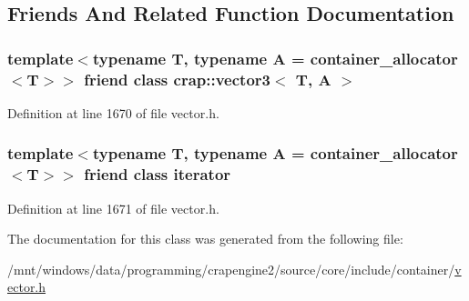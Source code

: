 \subsection{Friends And Related Function Documentation}
\hypertarget{classcrap_1_1vector3_1_1const__iterator_ad48a63b58dfe30a0d7ebfbdaa4a57e2b}{
\subsubsection[{crap\+::vector3$<$ T, A $>$}]{\setlength{\rightskip}{0pt plus 5cm}template$<$typename T, typename A = container\+\_\+allocator$<$\+T$>$$>$ friend class {\bf crap\+::vector3}$<$ T, A $>$\hspace{0.3cm}{\ttfamily [friend]}}}\label{classcrap_1_1vector3_1_1const__iterator_ad48a63b58dfe30a0d7ebfbdaa4a57e2b}


Definition at line 1670 of file vector.\+h.

\hypertarget{classcrap_1_1vector3_1_1const__iterator_a67171474c4da6cc8efe0c7fafefd2b2d}{
\subsubsection[{iterator}]{\setlength{\rightskip}{0pt plus 5cm}template$<$typename T, typename A = container\+\_\+allocator$<$\+T$>$$>$ friend class {\bf iterator}\hspace{0.3cm}{\ttfamily [friend]}}}\label{classcrap_1_1vector3_1_1const__iterator_a67171474c4da6cc8efe0c7fafefd2b2d}


Definition at line 1671 of file vector.\+h.



The documentation for this class was generated from the following file\+:\begin{DoxyCompactItemize}
\item 
/mnt/windows/data/programming/crapengine2/source/core/include/container/\hyperlink{vector_8h}{vector.\+h}\end{DoxyCompactItemize}
